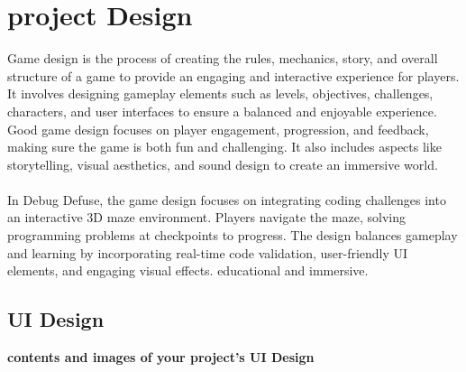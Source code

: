  \section{project Design}
 Game design is the process of creating the rules, mechanics, story, and overall structure of a game to provide an engaging and interactive experience for players. It involves designing gameplay elements such as levels, objectives, challenges, characters, and user interfaces to ensure a balanced and enjoyable experience. Good game design focuses on player engagement, progression, and feedback, making sure the game is both fun and challenging. It also includes aspects like storytelling, visual aesthetics, and sound design to create an immersive world.\\\\
 In Debug Defuse, the game design focuses on integrating coding challenges into an interactive 3D maze environment. Players navigate the maze, solving programming problems at checkpoints to progress. The design balances gameplay and learning by incorporating real-time code validation, user-friendly UI elements, and engaging visual effects. 
 educational and immersive.

 \subsection{UI Design}
\textbf{contents and images of your project's UI Design}

